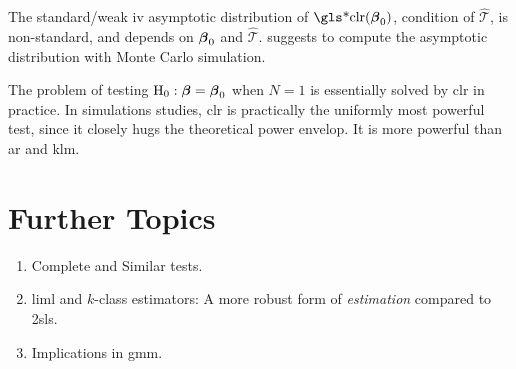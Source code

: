\documentclass[a4paper]{article}
\begin{document}
\begin{remark}
	The standard/weak \gls*{iv} asymptotic distribution of $\text{\gls*{clr}}(\bbeta_0)$,
	condition of $\hat{\mathcal{T}}$, is non-standard,
	and depends on $\boldsymbol{\beta}_0$ and $\hat{\mathcal{T}}$.
	\textcite{moreira-2002} suggests to compute the asymptotic distribution with Monte Carlo simulation.
\end{remark}


\begin{remark}
	\parencite{stock-2008}
	The problem of testing $\mathrm{H}_0:\boldsymbol{\beta}=\boldsymbol{\beta}_0$ when $N=1$ is essentially solved by \gls*{clr} in practice.
	In simulations studies, \gls*{clr} is practically the uniformly most powerful test,
	since it closely hugs the theoretical power envelop.
	It is more powerful than \gls*{ar} and \gls*{klm}.
\end{remark}

\section{Further Topics}

\begin{enumerate}
	\item
		Complete and Similar tests.
	\item
		\gls*{liml} and $k$-class estimators: A more robust form of \emph{estimation} compared to \gls*{2sls}.
	\item
		Implications in \gls*{gmm}.
\end{enumerate}

\printglossaries
\printbibliography
\end{document}
